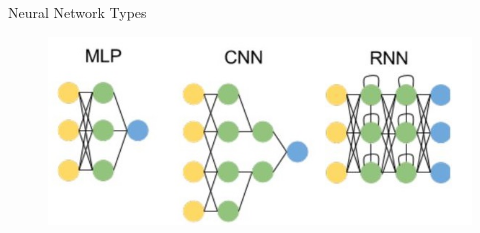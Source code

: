 \begin{frame}[allowframebreaks]{Neural Network Types}
    \begin{figure}
        \centering
        \includegraphics[width=1\textwidth,keepaspectratio]{images/rnn/slide_2_1_img.jpg}
    \end{figure}
\end{frame}


